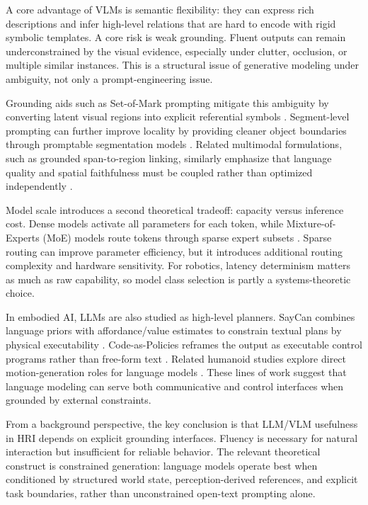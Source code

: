   A core advantage of VLMs is semantic flexibility: they can express rich descriptions and infer high-level relations that are hard to encode with rigid symbolic templates. A core risk is weak grounding.
  Fluent outputs can remain underconstrained by the visual evidence, especially under clutter, occlusion, or multiple similar instances. This is a structural issue of generative modeling under ambiguity,
  not only a prompt-engineering issue.

  Grounding aids such as Set-of-Mark prompting mitigate this ambiguity by converting latent visual regions into explicit referential symbols \cite{yang_set-of-mark_2023}. Segment-level prompting can
  further improve locality by providing cleaner object boundaries through promptable segmentation models \cite{kirillov_segment_2023}. Related multimodal formulations, such as grounded span-to-region
  linking, similarly emphasize that language quality and spatial faithfulness must be coupled rather than optimized independently \cite{peng_kosmos-2_2023}.

  Model scale introduces a second theoretical tradeoff: capacity versus inference cost. Dense models activate all parameters for each token, while Mixture-of-Experts (MoE) models route tokens through
  sparse expert subsets \cite{shazeer2017outrageouslylargeneuralnetworks}. Sparse routing can improve parameter efficiency, but it introduces additional routing complexity and hardware sensitivity. For
  robotics, latency determinism matters as much as raw capability, so model class selection is partly a systems-theoretic choice.

  In embodied AI, LLMs are also studied as high-level planners. SayCan combines language priors with affordance/value estimates to constrain textual plans by physical executability \cite{ahn_as_2022}.
  Code-as-Policies reframes the output as executable control programs rather than free-form text \cite{liang_code_2023}. Related humanoid studies explore direct motion-generation roles for language
  models \cite{catalini_llms_nodate}. These lines of work suggest that language modeling can serve both communicative and control interfaces when grounded by external constraints.

  From a background perspective, the key conclusion is that LLM/VLM usefulness in HRI depends on explicit grounding interfaces. Fluency is necessary for natural interaction but insufficient for reliable
  behavior. The relevant theoretical construct is constrained generation: language models operate best when conditioned by structured world state, perception-derived references, and explicit task
  boundaries, rather than unconstrained open-text prompting alone.

